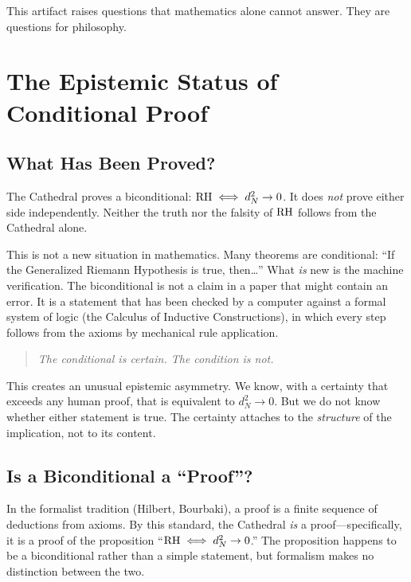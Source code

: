 \documentclass[11pt,a4paper]{article}
\begin{document}
This artifact raises questions that mathematics alone cannot answer.
They are questions for philosophy.

\section{The Epistemic Status of Conditional Proof}
\label{sec:conditional}

\subsection{What Has Been Proved?}

The Cathedral proves a biconditional: $\mathrm{RH} \iff d_N^2 \to 0$. It
does \emph{not} prove either side independently. Neither the truth
nor the falsity of $\mathrm{RH}$ follows from the Cathedral alone.

This is not a new situation in mathematics. Many theorems are
conditional: ``If the Generalized Riemann Hypothesis is true,
then\ldots'' What \emph{is} new is the machine verification. The
biconditional is not a claim in a paper that might contain an error.
It is a statement that has been checked by a computer against a
formal system of logic (the Calculus of Inductive Constructions),
in which every step follows from the axioms by mechanical rule
application.

\begin{quote}
\emph{The conditional is certain. The condition is not.}
\end{quote}

This creates an unusual epistemic asymmetry. We know, with a
certainty that exceeds any human proof, that \RH{} is equivalent to
$d_N^2 \to 0$. But we do not know whether either statement is true.
The certainty attaches to the \emph{structure} of the implication,
not to its content.

\subsection{Is a Biconditional a ``Proof''?}

In the formalist tradition (Hilbert, Bourbaki), a proof is a finite
sequence of deductions from axioms. By this standard, the Cathedral
\emph{is} a proof---specifically, it is a proof of the proposition
``$\mathrm{RH} \iff d_N^2 \to 0$.'' The proposition happens to be a
biconditional rather than a simple statement, but formalism makes no
distinction between the two.
\end{document}
